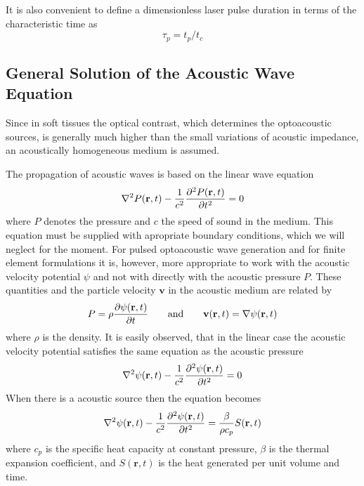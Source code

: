 ﻿\documentclass{article}
\begin{document}
It is also convenient to define a dimensionless laser pulse duration in terms of
the characteristic time as
$$
\tau_p = t_p/t_c
$$


\subsection{General Solution of the Acoustic Wave Equation}
Since in soft tissues the optical contrast, which determines the optoacoustic sources, is generally 
much higher than the small variations of acoustic impedance, 
an acoustically homogeneous medium is assumed. 

The propagation of acoustic waves is based on the linear wave equation
$$
\nabla^2 P(\mathbf{r},t) - {1\over c^2} {\partial^2 P(\mathbf{r},t) \over \partial t^2} = 0
$$
where $P$ denotes the pressure and $c$ the speed of sound in the medium.
This equation must be supplied with apropriate boundary conditions,
which we will neglect for the moment. For pulsed optoacoustic wave
generation and for finite element formulations it
is, however, more appropriate to work with the acoustic velocity
potential $\psi$ and not with directly with the acoustic pressure $P$. These quantities and
the particle velocity $\mathbf{v}$ in the acoustic medium are related by
$$
P = \rho {\partial \psi(\mathbf{r},t)\over\partial t} \qquad \mathrm{and}\qquad \mathbf{v}(\mathbf{r},t)=\nabla \psi(\mathbf{r},t)
$$
where $\rho$ is the density.  It is easily observed, that in the linear case the acoustic velocity
potential satisfies the same equation as the acoustic pressure
$$
\nabla^2\psi(\mathbf{r},t) - {1\over c^2} {\partial^2 \psi(\mathbf{r},t) \over \partial t^2} = 0
$$
When there is a acoustic source then the equation becomes
$$
\nabla^2\psi(\mathbf{r},t) - {1\over c^2} {\partial^2 \psi(\mathbf{r},t) \over \partial t^2} = {\beta\over \rho c_p} S(\mathbf{r},t)
$$
where $c_p$ is the specific heat
capacity at constant pressure, $\beta$ is the thermal expansion
coefficient, and $S(\mathbf{r},t)$ is the heat generated per unit volume
and time.  
\end{document}
